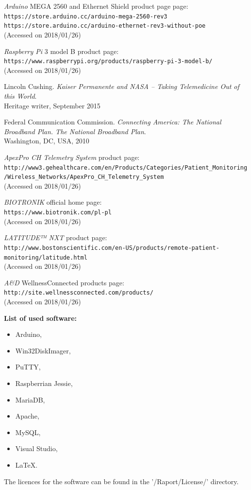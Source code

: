 \documentclass[12pt,]{article}
\numberwithin{figure}{section}
\begin{document}
\newpage
\begin{thebibliography}{9}
\textit{Arduino} MEGA 2560 and Ethernet Shield product page page: 
\\\texttt{https://store.arduino.cc/arduino-mega-2560-rev3}
\\\texttt{https://store.arduino.cc/arduino-ethernet-rev3-without-poe}
\\(Accessed on 2018/01/26)
 
\textit{Raspberry Pi} 3 model B product page:
\\\texttt{https://www.raspberrypi.org/products/raspberry-pi-3-model-b/}
\\(Accessed on 2018/01/26)

Lincoln Cushing.
\textit{Kaiser Permanente and NASA – Taking Telemedicine Out of this World}. 
\\Heritage writer, September 2015

Federal Communication Commission.
\textit{Connecting America: The National Broadband Plan. The National Broadband Plan}. 
\\Washington, DC, USA, 2010

\textit{ApexPro CH Telemetry System} product page:
\\\texttt{http://www3.gehealthcare.com/en/Products/Categories/Patient\_Monitoring/\newline Wireless\_Networks/ApexPro\_CH\_Telemetry\_System}
\\(Accessed on 2018/01/26)

\textit{BIOTRONIK} official home page:
\\\texttt{https://www.biotronik.com/pl-pl}
\\(Accessed on 2018/01/26)

\textit{LATITUDE™ NXT} product page:
\\\texttt{http://www.bostonscientific.com/en-US/products/remote-patient-monitoring\newline /latitude.html}
\\(Accessed on 2018/01/26)

\textit{A\&D} WellnessConnected products page:
\\\texttt{http://site.wellnessconnected.com/products/}
\\(Accessed on 2018/01/26)
\end{thebibliography}
\textbf{List of used software:}
\begin{itemize}
\item Arduino,
\item Win32DiskImager,
\item PuTTY,
\item Raspberrian Jessie,
\item MariaDB,
\item Apache,
\item MySQL,
\item Visual Studio,
\item LaTeX.
\end{itemize}
The licences for the software can be found in the '/Raport/License/' directory.
\end{document}
